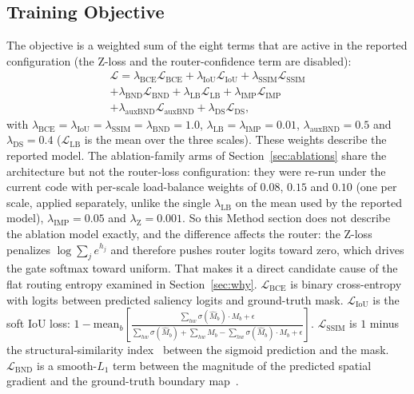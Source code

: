 \documentclass[10pt,a4paper,twocolumn,twoside]{article}
\begin{document}
\subsection{Training Objective}
The objective is a weighted sum of the eight terms that are active in the reported configuration
(the Z-loss and the router-confidence term are disabled):
\begin{multline}
  \mathcal{L} = \lambda_{\text{BCE}}\mathcal{L}_{\text{BCE}}
  + \lambda_{\text{IoU}}\mathcal{L}_{\text{IoU}}
  + \lambda_{\text{SSIM}}\mathcal{L}_{\text{SSIM}}\\
  + \lambda_{\text{BND}}\mathcal{L}_{\text{BND}}
  + \lambda_{\text{LB}}\mathcal{L}_{\text{LB}}
  + \lambda_{\text{IMP}}\mathcal{L}_{\text{IMP}}\\
  + \lambda_{\text{auxBND}}\mathcal{L}_{\text{auxBND}}
  + \lambda_{\text{DS}}\mathcal{L}_{\text{DS}},
  \label{eq:loss}
\end{multline}
with $\lambda_{\text{BCE}}{=}\lambda_{\text{IoU}}{=}\lambda_{\text{SSIM}}{=}\lambda_{\text{BND}}{=}1.0$,
$\lambda_{\text{LB}}{=}\lambda_{\text{IMP}}{=}0.01$, $\lambda_{\text{auxBND}}{=}0.5$ and $\lambda_{\text{DS}}{=}0.4$ ($\mathcal{L}_{\text{LB}}$ is the mean over the three scales).
These weights describe the reported model. The ablation-family arms of
Section~\ref{sec:ablations} share the architecture but not the router-loss configuration: they
were re-run under the current code with per-scale load-balance weights of $0.08$, $0.15$ and
$0.10$ (one per scale, applied separately, unlike the single
$\lambda_{\text{LB}}$ on the mean used by the reported model),
$\lambda_{\text{IMP}}{=}0.05$ and $\lambda_{\text{Z}}{=}0.001$. So this Method section does not
describe the ablation model exactly, and the difference affects the router: the Z-loss
penalizes $\log\sum_j e^{h_j}$ and therefore pushes router logits toward zero, which drives
the gate softmax toward uniform. That makes it a direct candidate cause of the flat routing
entropy examined in Section~\ref{sec:why}.
$\mathcal{L}_{\text{BCE}}$ is binary cross-entropy with logits between predicted saliency logits and ground-truth mask.
$\mathcal{L}_{\text{IoU}}$ is the soft IoU loss:
$1 - \text{mean}_b\!\left[\frac{\sum_{hw}\sigma(\hat{M}_b) \cdot M_b + \epsilon}{\sum_{hw}\sigma(\hat{M}_b) + \sum_{hw} M_b - \sum_{hw}\sigma(\hat{M}_b) \cdot M_b + \epsilon}\right]$.
$\mathcal{L}_{\text{SSIM}}$ is $1$ minus the structural-similarity index~\cite{wang2004ssim} between the sigmoid prediction and the mask.
$\mathcal{L}_{\text{BND}}$ is a smooth-$L_1$ term between the magnitude of the predicted spatial gradient and the ground-truth boundary map~\cite{qin2019basnet}.
\end{document}
